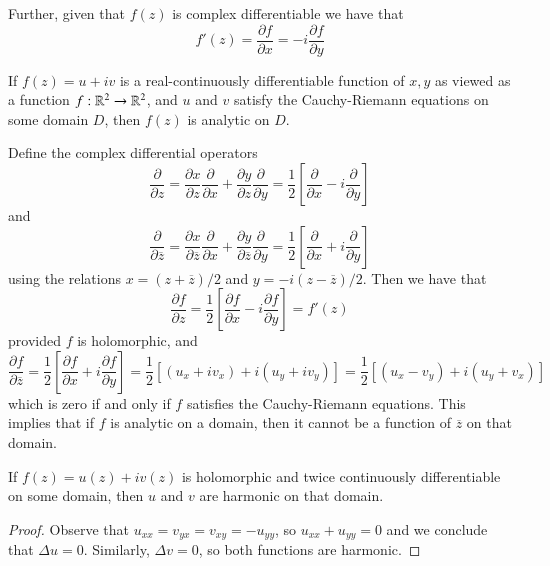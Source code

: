 \documentclass[12pt, a4paper, oneside, openright, titlepage]{book}
\begin{document}
Further, given that $f(z)$ is complex differentiable we have that \begin{equation*}
    f'(z) = \frac{\partial f}{\partial x} = -i\frac{\partial f}{\partial y}
\end{equation*}

\begin{thm}
    If $f(z) = u+iv$ is a real-continuously differentiable function of $x,y$ as viewed as a function $f:\mathbb R^2\rightarrow \mathbb R^2$, and $u$ and $v$ satisfy the Cauchy-Riemann equations on some domain $D$, then $f(z)$ is analytic on $D$.
\end{thm}

Define the complex differential operators \begin{equation*}
    \frac{\partial}{\partial z} = \frac{\partial x}{\partial z}\frac{\partial }{\partial x}+\frac{\partial y}{\partial z}\frac{\partial }{\partial y} = \frac{1}{2}\left[\frac{\partial}{\partial x}-i\frac{\partial}{\partial y}\right]
\end{equation*}
and \begin{equation*}
    \frac{\partial}{\partial \overline{z}} = \frac{\partial x}{\partial \overline{z}}\frac{\partial }{\partial x}+\frac{\partial y}{\partial \overline{z}}\frac{\partial }{\partial y} = \frac{1}{2}\left[\frac{\partial}{\partial x}+i\frac{\partial}{\partial y}\right]
\end{equation*}
using the relations $x = (z+\overline{z})/2$ and $y = -i(z-\overline{z})/2$. Then we have that \begin{equation*}
    \frac{\partial f}{\partial z} = \frac{1}{2}\left[\frac{\partial f}{\partial x}-i\frac{\partial f}{\partial y}\right] = f'(z)
\end{equation*}
provided $f$ is holomorphic, and \begin{equation*}
    \frac{\partial f}{\partial \overline{z}} = \frac{1}{2}\left[\frac{\partial f}{\partial x}+i\frac{\partial f}{\partial y}\right] = \frac{1}{2}\left[(u_x+iv_x) + i(u_y+iv_y)\right] = \frac{1}{2}\left[(u_x-v_y)+i(u_y+v_x)\right]
\end{equation*}
which is zero if and only if $f$ satisfies the Cauchy-Riemann equations. This implies that if $f$ is analytic on a domain, then it cannot be a function of $\overline{z}$ on that domain.

\begin{thm}
    If $f(z)= u(z)+iv(z)$ is holomorphic and twice continuously differentiable on some domain, then $u$ and $v$ are harmonic on that domain.
\end{thm}
\begin{proof}
    Observe that $u_{xx} = v_{yx} = v_{xy} = -u_{yy}$, so $u_{xx} + u_{yy} = 0$ and we conclude that $\Delta u = 0$. Similarly, $\Delta v = 0$, so both functions are harmonic.
\end{proof}
\end{document}
